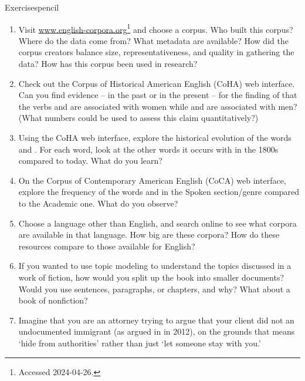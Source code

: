 \begin{tblsfilledsymbol}{Exercises}{pencil}
    


\begin{enumerate}
\setcounter{enumi}{0}
\item  Visit \url{www.english-corpora.org}\footnote{Accessed 2024-04-26.} and choose a
corpus.  Who built this corpus?  Where do the data come from?  What
metadata are available?  How did the corpus creators balance size,
representativeness, and quality in gathering the data?  How has this
corpus been used in research?

\item  Check out the Corpus of Historical American
English (CoHA) web interface.  Can you find evidence -- in the past or
in the present -- for the finding of \citet{Underwood-etal:2018} that the verbs
 and  are associated with women while
 and  are associated with men?  (What
numbers could be used to assess this claim quantitatively?)

\item  Using the CoHA web interface, explore the historical evolution of the words
 and .  For each word, look at the
other words it occurs with in the 1800s compared to today.  What do you learn?

\item On the Corpus of Contemporary American English
(CoCA) web interface, explore the frequency of the words  and  in the Spoken section/genre compared to the
Academic one.  What do you observe?

\item  Choose a language other than English, and search
online to see what corpora are available in that language.  How big
are these corpora?  How do these resources compare to those available
for English?


\item  If you wanted to use topic modeling to understand
the topics discussed in a work of fiction, how would you split up the
book into smaller documents?  Would you use sentences, paragraphs, or
chapters, and why?  What about a book of nonfiction?

\item Imagine that you are an attorney trying to argue
that your client did not  an undocumented immigrant (as
argued in  in 2012), on the grounds
that  means `hide from authorities' rather than just
`let someone stay with you.'


\end{enumerate}
\end{tblsfilledsymbol}
